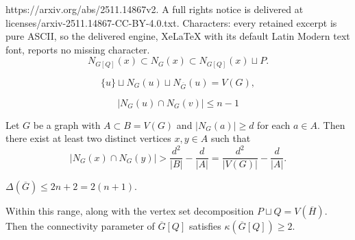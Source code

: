 \documentclass[10pt,a4paper]{amsart}
\begin{document}
https://arxiv.org/abs/2511.14867v2. A full rights notice is delivered at licenses/arxiv-2511.14867-CC-BY-4.0.txt. Characters: every retained excerpt is pure ASCII, so the delivered engine, XeLaTeX with its default Latin Modern text font, reports no missing character.
\begin{equation}\label{nbd dependency}
N_{G[Q]}(x)\subset N_{G}(x)\subset N_{G[Q]}(x)\sqcup P.
\end{equation}

\begin{equation}\label{nbd complementary dependency}
\{u\}\sqcup N_{G}(u)\sqcup N_{\overline{G}}(u)=V(G),
\end{equation}

\begin{equation}\label{K_2n freeness dependency}
|N_{G}(u)\cap N_{G}(v)|\leq n-1
\end{equation}

\begin{corollary}\label{intersection lemma 2}
Let $G$ be a graph with $A\subset B=V(G)$ and $|N_{G}(a)|\geq d$ for each $a\in A$. Then there exist at least two distinct vertices $x,y\in A$ such that 
\begin{equation*}
 |N_{G}(x)\cap N_{G}(y)|> \frac{d^{2}}{|B|}-\frac{d}{|A|}=\frac{d^{2}}{|V(G)|}-\frac{d}{|A|}.   
\end{equation*}
\end{corollary}

\begin{lemma}\label{upper bound Del(barG)}
 $\Delta(\overline{G})\leq 2n+2=2(n+1)$. 
\end{lemma}

\begin{lemma}\label{connectivity-first range}
Within this range, along with the vertex set decomposition $P\sqcup Q=V(\overline{H})$. Then the connectivity parameter of $\overline{G}[Q]$ satisfies $\kappa(\overline{G}[Q])\geq2$.
\end{lemma}
\end{document}
